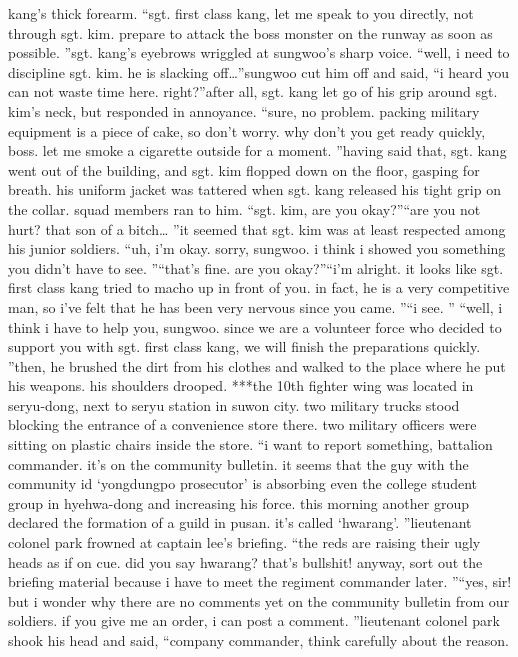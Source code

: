  kang’s thick forearm.
“sgt.
 first class kang, let me speak to you directly, not through sgt.
 kim.
 prepare to attack the boss monster on the runway as soon as possible.
”sgt.
 kang’s eyebrows wriggled at sungwoo’s sharp voice.
“well, i need to discipline sgt.
 kim.
 he is slacking off…”sungwoo cut him off and said, “i heard you can not waste time here.
 right?”after all, sgt.
 kang let go of his grip around sgt.
 kim’s neck, but responded in annoyance.
“sure, no problem.
 packing military equipment is a piece of cake, so don’t worry.
 why don’t you get ready quickly, boss.
 let me smoke a cigarette outside for a moment.
”having said that, sgt.
 kang went out of the building, and sgt.
 kim flopped down on the floor, gasping for breath.
 his uniform jacket was tattered when sgt.
 kang released his tight grip on the collar.
 squad members ran to him.
“sgt.
 kim, are you okay?”“are you not hurt? that son of a bitch… ”it seemed that sgt.
 kim was at least respected among his junior soldiers.
“uh, i’m okay.
 sorry, sungwoo.
 i think i showed you something you didn’t have to see.
”“that’s fine.
 are you okay?”“i’m alright.
 it looks like sgt.
 first class kang tried to macho up in front of you.
 in fact, he is a very competitive man, so i’ve felt that he has been very nervous since you came.
”“i see.
”
“well, i think i have to help you, sungwoo.
 since we are a volunteer force who decided to support you with sgt.
 first class kang, we will finish the preparations quickly.
”then, he brushed the dirt from his clothes and walked to the place where he put his weapons.
 his shoulders drooped.
***the 10th fighter wing was located in seryu-dong, next to seryu station in suwon city.
two military trucks stood blocking the entrance of a convenience store there.
two military officers were sitting on plastic chairs inside the store.
“i want to report something, battalion commander.
 it’s on the community bulletin.
 it seems that the guy with the community id ‘yongdungpo prosecutor’ is absorbing even the college student group in hyehwa-dong and increasing his force.
 this morning another group declared the formation of a guild in pusan.
 it’s called ‘hwarang’.
”lieutenant colonel park frowned at captain lee’s briefing.
“the reds are raising their ugly heads as if on cue.
 did you say hwarang? that’s bullshit! anyway, sort out the briefing material because i have to meet the regiment commander later.
”“yes, sir! but i wonder why there are no comments yet on the community bulletin from our soldiers.
 if you give me an order, i can post a comment.
”lieutenant colonel park shook his head and said, “company commander, think carefully about the reason.
